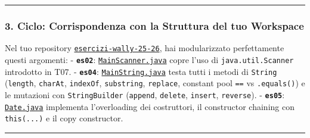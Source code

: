 \documentclass[11pt,a4paper]{article}
\newcommand{\passthrough}[1]{#1}
\begin{document}
\begin{center}\rule{0.5\linewidth}{0.5pt}\end{center}

\subsubsection{3. Ciclo: Corrispondenza con la Struttura del tuo
Workspace}\label{ciclo-corrispondenza-con-la-struttura-del-tuo-workspace}

Nel tuo repository
\href{file:///home/wally/Documenti/GitHub/Programmazione-II/25-26/esercizi-wally-25-26}{\passthrough{\lstinline!esercizi-wally-25-26!}},
hai modularizzato perfettamente questi argomenti: -
\textbf{\passthrough{\lstinline!es02!}}:
\href{file:///home/wally/Documenti/GitHub/Programmazione-II/25-26/esercizi-wally-25-26/es02/src/main/java/es02/MainScanner.java}{\passthrough{\lstinline!MainScanner.java!}}
copre l'uso di \passthrough{\lstinline!java.util.Scanner!} introdotto in
T07. - \textbf{\passthrough{\lstinline!es04!}}:
\href{file:///home/wally/Documenti/GitHub/Programmazione-II/25-26/esercizi-wally-25-26/es04/src/main/java/es04/MainString.java}{\passthrough{\lstinline!MainString.java!}}
testa tutti i metodi di \passthrough{\lstinline!String!}
(\passthrough{\lstinline!length!}, \passthrough{\lstinline!charAt!},
\passthrough{\lstinline!indexOf!}, \passthrough{\lstinline!substring!},
\passthrough{\lstinline!replace!}, constant pool
\passthrough{\lstinline!==!} vs \passthrough{\lstinline!.equals()!}) e
le mutazioni con \passthrough{\lstinline!StringBuilder!}
(\passthrough{\lstinline!append!}, \passthrough{\lstinline!delete!},
\passthrough{\lstinline!insert!}, \passthrough{\lstinline!reverse!}). -
\textbf{\passthrough{\lstinline!es05!}}:
\href{file:///home/wally/Documenti/GitHub/Programmazione-II/25-26/esercizi-wally-25-26/es05/src/main/java/es05/Date.java}{\passthrough{\lstinline!Date.java!}}
implementa l'overloading dei costruttori, il constructor chaining con
\passthrough{\lstinline!this(...)!} e il copy constructor.

\begin{center}\rule{0.5\linewidth}{0.5pt}\end{center}
\end{document}
